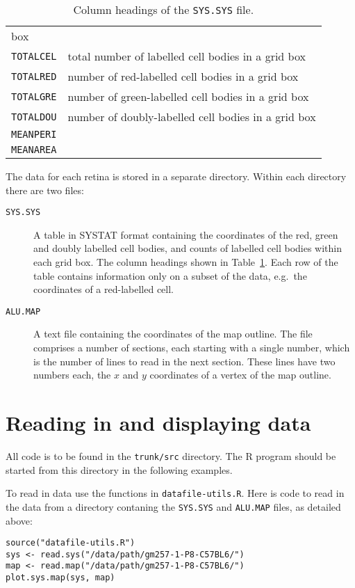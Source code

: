 \documentclass{article}
\begin{document}
\begin{table}
\begin{tabular}{ll}
    box \\
    \texttt{TOTALCEL} & total number of labelled cell bodies in a grid box \\
    \texttt{TOTALRED} & number of red-labelled cell bodies in a grid box \\
    \texttt{TOTALGRE} & number of green-labelled cell bodies in a grid box \\
    \texttt{TOTALDOU} & number of doubly-labelled cell bodies in a grid box \\
    \texttt{MEANPERI} & \\
    \texttt{MEANAREA} & \\
  \end{tabular}
  \caption{Column headings of the \texttt{SYS.SYS} file.}
  \label{tab:data-format}
\end{table}

The data for each retina is stored in a separate directory. Within
each directory there are two files:
\begin{description}
\item[\texttt{SYS.SYS}] A table in SYSTAT format containing the
  coordinates of the red, green and doubly labelled cell bodies, and
  counts of labelled cell bodies within each grid box. The column
  headings shown in Table~\ref{tab:data-format}.  Each row of the
  table contains information only on a subset of the data, e.g.\ the
  coordinates of a red-labelled cell.
\item[\texttt{ALU.MAP}] A text file containing the coordinates of the
  map outline. The file comprises a number of sections, each starting
  with a single number, which is the number of lines to read in the
  next section. These lines have two numbers each, the $x$ and $y$
  coordinates of a vertex of the map outline.
\end{description}

\section{Reading in and displaying data}
\label{manual:sec:datafile-utils}

All code is to be found in the \texttt{trunk/src} directory. The R
program should be started from this directory in the following examples.

To read in data use the functions in \texttt{datafile-utils.R}. Here
is code to read in the data from a directory contaning the
\texttt{SYS.SYS} and \texttt{ALU.MAP} files, as detailed above:
\begin{verbatim}
source("datafile-utils.R")
sys <- read.sys("/data/path/gm257-1-P8-C57BL6/")
map <- read.map("/data/path/gm257-1-P8-C57BL6/")
plot.sys.map(sys, map)
\end{verbatim}
\end{document}

